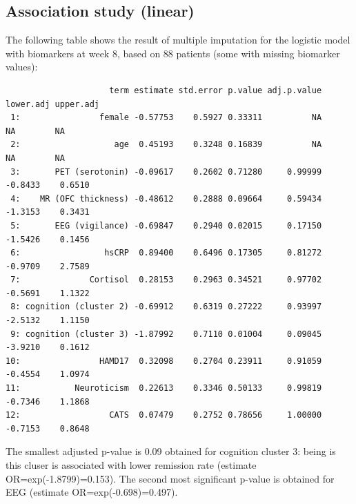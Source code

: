 \documentclass[12pt]{article}
\begin{document}
\subsection{Association study (linear)}
\label{sec:orgaf55d8c}

The following table shows the result of multiple imputation for the
logistic model with biomarkers at week 8, based on 88 patients (some
with missing biomarker values):
\label{}
\begin{verbatim}
                     term estimate std.error p.value adj.p.value lower.adj upper.adj
 1:                female -0.57753    0.5927 0.33311          NA        NA        NA
 2:                   age  0.45193    0.3248 0.16839          NA        NA        NA
 3:       PET (serotonin) -0.09617    0.2602 0.71280     0.99999   -0.8433    0.6510
 4:    MR (OFC thickness) -0.48612    0.2888 0.09664     0.59434   -1.3153    0.3431
 5:       EEG (vigilance) -0.69847    0.2940 0.02015     0.17150   -1.5426    0.1456
 6:                 hsCRP  0.89400    0.6496 0.17305     0.81272   -0.9709    2.7589
 7:              Cortisol  0.28153    0.2963 0.34521     0.97702   -0.5691    1.1322
 8: cognition (cluster 2) -0.69912    0.6319 0.27222     0.93997   -2.5132    1.1150
 9: cognition (cluster 3) -1.87992    0.7110 0.01004     0.09045   -3.9210    0.1612
10:                HAMD17  0.32098    0.2704 0.23911     0.91059   -0.4554    1.0974
11:           Neuroticism  0.22613    0.3346 0.50133     0.99819   -0.7346    1.1868
12:                  CATS  0.07479    0.2752 0.78656     1.00000   -0.7153    0.8648
\end{verbatim}

The smallest adjusted p-value is 0.09 obtained for cognition cluster
3: being is this cluser is associated with lower remission rate
(estimate OR=exp(-1.8799)=0.153). The second most significant p-value
is obtained for EEG (estimate OR=exp(-0.698)=0.497).

\clearpage
\end{document}
